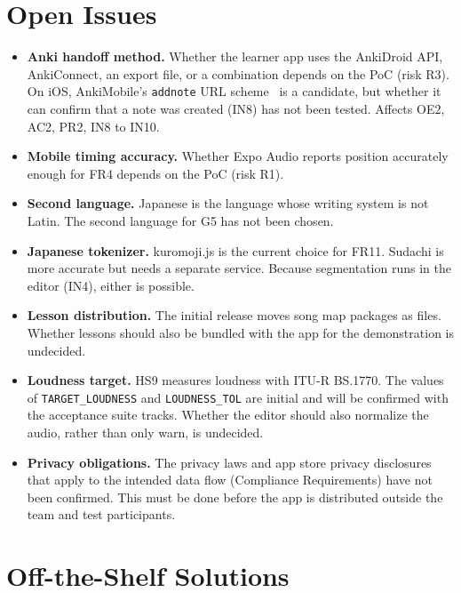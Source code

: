 \documentclass[12pt]{article}
\newcommand{\cn}[1]{\texttt{#1}}
\begin{document}
\section{Open Issues}
\begin{itemize}
    \item \textbf{Anki handoff method.} Whether the learner app uses the
          AnkiDroid API, AnkiConnect, an export file, or a combination
          depends on the PoC (risk R3). On iOS, AnkiMobile's
          \texttt{addnote} URL scheme~\cite{AnkiMobileURL} is a candidate,
          but whether it can confirm that a note was created (IN8) has not
          been tested. Affects OE2, AC2, PR2, IN8 to IN10.
    \item \textbf{Mobile timing accuracy.} Whether Expo Audio reports position
          accurately enough for FR4 depends on the PoC (risk R1).
    \item \textbf{Second language.} Japanese is the language whose writing system is not Latin. The
          second language for G5 has not been chosen.
    \item \textbf{Japanese tokenizer.} kuromoji.js is the current choice for
          FR11. Sudachi is more accurate but needs a separate service. Because
          segmentation runs in the editor (IN4), either is possible.
    \item \textbf{Lesson distribution.} The initial release moves song map
          packages as files. Whether lessons should also be bundled with the
          app for the demonstration is undecided.
    \item \textbf{Loudness target.} HS9 measures loudness with ITU-R
          BS.1770. The values of \cn{TARGET\_LOUDNESS} and
          \cn{LOUDNESS\_TOL} are initial and will be confirmed with the
          acceptance suite tracks. Whether the editor should also normalize
          the audio, rather than only warn, is undecided.
    \item \textbf{Privacy obligations.} The privacy laws and app store privacy
          disclosures that apply to the intended data flow (Compliance
          Requirements) have not been confirmed. This must be done before the
          app is distributed outside the team and test participants.
\end{itemize}

\section{Off-the-Shelf Solutions}
\end{document}
